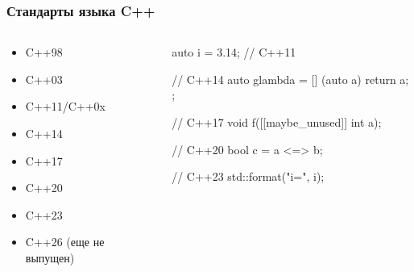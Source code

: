 \documentclass[compress]{beamer}
\begin{document}
\begin{frame}[fragile]

    \frametitle{Стандарты языка C++}

    \begin{columns}

        \begin{column}{0.4\textwidth}

            \begin{itemize}

                \item C++98
                \item C++03
                \item C++11/C++0x
                \item C++14
                \item C++17
                \item C++20
                \item C++23
                \item C++26 (еще не выпущен)

            \end{itemize}

        \end{column}

        \begin{column}{0.6\textwidth}

            \begin{cppinplacelisting}[\footnotesize]
auto i = 3.14; // C++11

// C++14
auto glambda = [] (auto a) {
    return a;
};

// C++17
void f([[maybe_unused]] int a);

// C++20
bool c = a <=> b;

// C++23
std::format("i={}\n", i);
            \end{cppinplacelisting}
        \end{column}

    \end{columns}

\end{frame}
\end{document}
